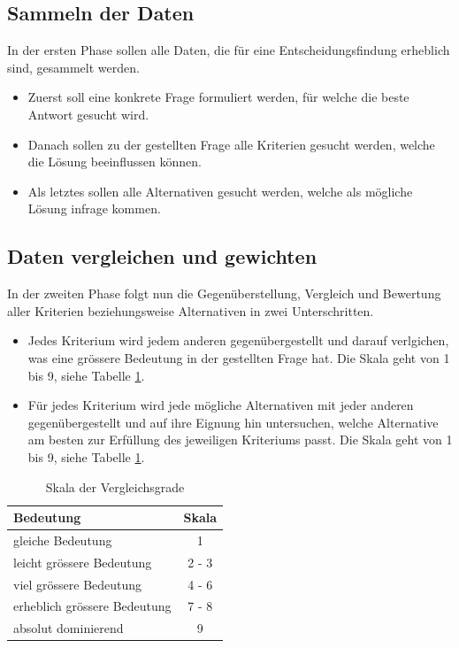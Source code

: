   \subsection{Sammeln der Daten}
  
  In der ersten Phase sollen alle Daten, die für eine Entscheidungsfindung
  erheblich sind, gesammelt werden.
  
  \begin{itemize}
    \item Zuerst soll eine konkrete Frage formuliert werden, für welche die
    beste Antwort gesucht wird.
    \item Danach sollen zu der gestellten Frage alle Kriterien  gesucht werden,
    welche die Lösung beeinflussen können.
    \item Als letztes sollen alle Alternativen gesucht werden, welche als
    mögliche Lösung infrage kommen.
  \end{itemize}
  
  \subsection{Daten vergleichen und gewichten}
  
  In der zweiten Phase folgt nun die Gegenüberstellung, Vergleich und Bewertung
  aller Kriterien beziehungsweise Alternativen in zwei Unterschritten.
  
  \begin{itemize}
    \item Jedes Kriterium wird jedem anderen gegenübergestellt und darauf
    verlgichen, was eine grössere Bedeutung in der gestellten Frage hat. Die
    Skala geht von 1 bis 9, siehe Tabelle \ref{tab:vergleichsgrade}.
    \item Für jedes Kriterium wird jede mögliche Alternativen mit jeder anderen
    gegenübergestellt und auf ihre Eignung hin untersuchen, welche Alternative
    am besten zur Erfüllung des jeweiligen Kriteriums passt. Die Skala geht von
    1 bis 9, siehe Tabelle \ref{tab:vergleichsgrade}.
  \end{itemize}
  
  \begin{table}[ht]
    \sffamily 
    \begin{center}
      \begin{tabular}{lc}
        \toprule
        \textbf{Bedeutung} & \textbf{Skala}\\
        \midrule
        gleiche Bedeutung & 1\\
        leicht grössere Bedeutung & 2 - 3\\
        viel grössere Bedeutung & 4 - 6\\
        erheblich grössere Bedeutung & 7 - 8\\
        absolut dominierend & 9\\
        \bottomrule
      \end{tabular}
      \caption{Skala der Vergleichsgrade}
      \label{tab:vergleichsgrade}
    \end{center}
  \end{table}
    
